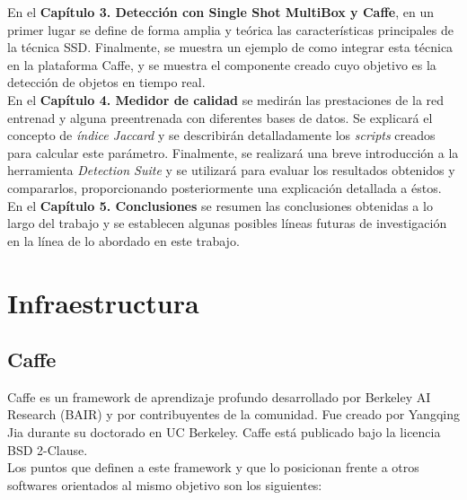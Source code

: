 \documentclass[a4paper, 12pt, spanish, chapterprefix, numbers=noenddot]{book}
\begin{document}
En el \textbf{Capítulo 3. Detección con Single Shot MultiBox y Caffe}, en un primer lugar se define  de forma amplia y teórica las características principales de la técnica SSD. Finalmente, se muestra un ejemplo de como integrar esta técnica en la plataforma Caffe, y se muestra el componente creado cuyo objetivo es la detección de objetos en tiempo real.\\

En el \textbf{Capítulo 4. Medidor de calidad} se medirán las prestaciones de la red entrenad y alguna preentrenada con diferentes bases de datos. Se explicará el concepto de \textit{índice Jaccard} y se describirán detalladamente los \textit{scripts} creados para calcular este parámetro. Finalmente, se realizará una breve introducción a la herramienta \textit{Detection Suite} y se utilizará para evaluar los resultados obtenidos y compararlos, proporcionando posteriormente una explicación detallada a éstos.\\

En el \textbf{Capítulo 5. Conclusiones} se resumen las conclusiones obtenidas a lo largo del trabajo y se establecen algunas posibles líneas futuras de investigación en la línea de lo abordado en este trabajo.

\chapter{Infraestructura}

\section{Caffe}

Caffe\cite{Caffe} es un framework de aprendizaje profundo desarrollado por Berkeley AI Research (BAIR) y por contribuyentes de la comunidad. Fue creado por Yangqing Jia durante su doctorado en UC Berkeley. Caffe está publicado bajo la licencia BSD 2-Clause.\\

Los puntos que definen a este framework y que lo posicionan frente a otros softwares orientados al mismo objetivo son los siguientes:
\end{document}
